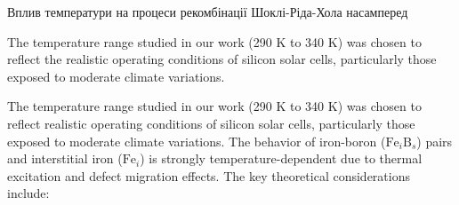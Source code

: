 \documentclass[a4paper,fleqn]{cas-sc}
\begin{document}
Вплив температури на процеси рекомбінації Шоклі-Ріда-Хола насамперед




The temperature range studied in our work (290 K to 340 K) was chosen to reflect the realistic operating conditions of silicon solar cells, particularly those exposed to moderate climate variations.


The temperature range studied in our work (290 K to 340 K) was chosen to reflect realistic operating conditions of silicon solar cells, particularly those exposed to moderate climate variations. The behavior of iron-boron ($\mathrm{Fe}_i\mathrm{B}_s$) pairs and interstitial iron ($\mathrm{Fe}_i$) is strongly temperature-dependent due to thermal excitation and defect migration effects. The key theoretical considerations include:
\end{document}
